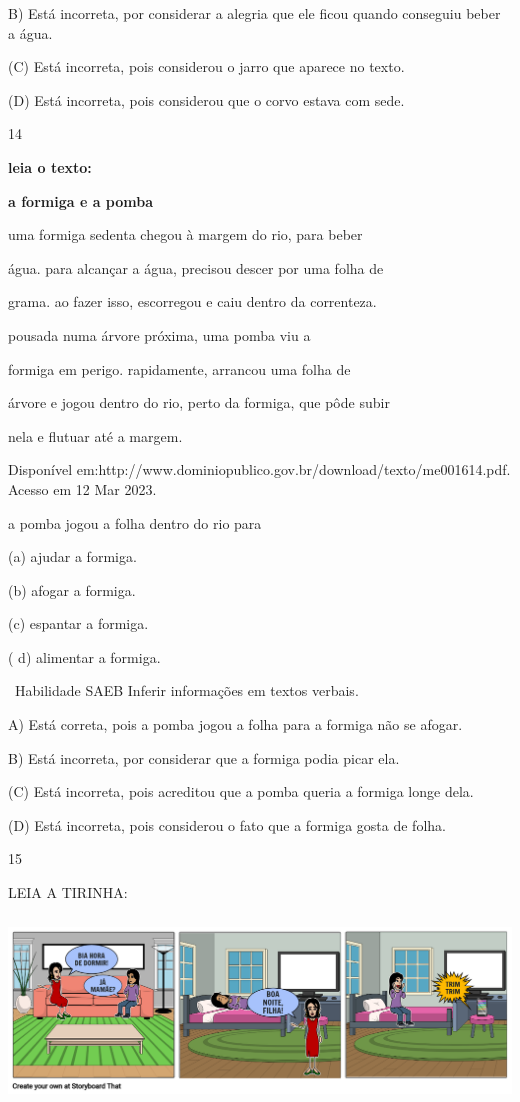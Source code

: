 {{{{{{B) Está incorreta, por considerar a alegria que ele ficou quando
conseguiu beber a água.

(C) Está incorreta, pois considerou o jarro que aparece no texto.

(D) Está incorreta, pois considerou que o corvo estava com sede.

\num{14}

\textbf{leia o texto:}

\textbf{a formiga e a pomba}

uma formiga sedenta chegou à margem do rio, para beber

água. para alcançar a água, precisou descer por uma folha de

grama. ao fazer isso, escorregou e caiu dentro da correnteza.

pousada numa árvore próxima, uma pomba viu a

formiga em perigo. rapidamente, arrancou uma folha de

árvore e jogou dentro do rio, perto da formiga, que pôde subir

nela e flutuar até a margem.

Disponível
em:http://www.dominiopublico.gov.br/download/texto/me001614.pdf. Acesso
em 12 Mar 2023.

a pomba jogou a folha dentro do rio para

(a) ajudar a formiga.

(b) afogar a formiga.

(c) espantar a formiga.

( d) alimentar a formiga.

~Habilidade SAEB Inferir informações em textos verbais.

A) Está correta, pois a pomba jogou a folha para a formiga não se
afogar.

B) Está incorreta, por considerar que a formiga podia picar ela.

(C) Está incorreta, pois acreditou que a pomba queria a formiga longe
dela.

(D) Está incorreta, pois considerou o fato que a formiga gosta de folha.

\num{15}

LEIA A TIRINHA:

\includegraphics[width=5.90556in,height=1.95694in]{media/image172.png}

}}}}}}
